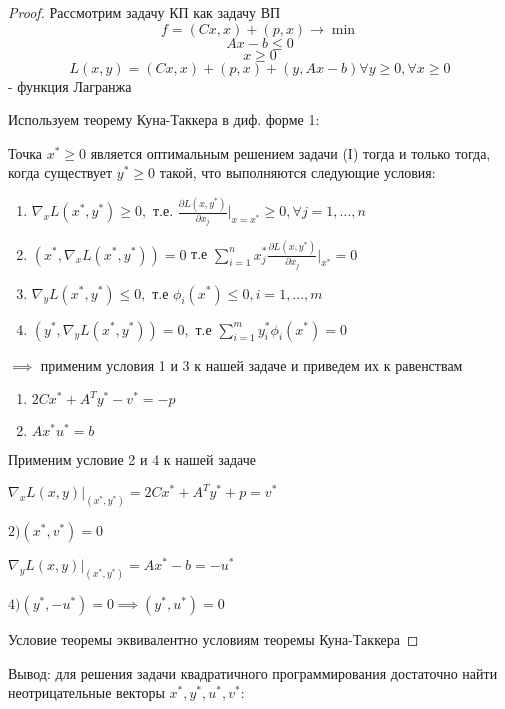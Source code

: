 \documentclass[a4paper]{article}
\theoremstyle{definition}
\theoremstyle{remark}
\begin{document}
\begin{proof}
    Рассмотрим задачу КП как задачу ВП
    \[f = (Cx, x) + (p, x)\to \min\]
    \[Ax - b\le 0\]
    \[x\ge 0\]
    \[L(x, y) = (Cx, x) + (p, x) + (y, Ax -b )\forall y\ge 0 , \forall x\ge 0\] - функция Лагранжа

    Используем теорему Куна-Таккера в диф. форме 1:
    
    Точка $x^* \ge 0$ является оптимальным решением задачи (I) тогда  и только тогда, когда существует $y^*\ge 0$ такой, что выполняются следующие условия:
    \begin{enumerate}
        \item $\nabla_x L(x^*, y^*) \ge 0,$ т.е. $\frac{\partial L(x, y^*)}{\partial x_j} |_{x = x^*} \ge 0, \forall j = 1, \dots, n$
        \item $(x^*, \nabla_x L(x^*, y^*)) = 0$ т.е $\sum_{i = 1}^n x^*_j\frac{\partial L(x, y^*)}{\partial x_j}|_{x^*} = 0$
        \item $\nabla_y L(x^*, y^*) \le 0,$ т.е $\phi_i(x^*)\le 0, i = 1, ..., m$
        \item $(y^*, \nabla_y L(x^*, y^*)) = 0, $ т.е $\sum_{i = 1}^{m}y^*_i \phi_i(x^*) = 0$
    \end{enumerate}
    $\implies$ применим условия 1 и 3 к нашей задаче и приведем их к равенствам 
    \begin{enumerate}
        \item $2Cx^* + A^T y^* - v^* = -p$
        \item $Ax^* u^* = b$
    \end{enumerate}
    Применим условие 2 и 4 к нашей задаче

    $\nabla_x L(x, y)|_{(x^*, y^*)} = 2Cx^* + A^T y^* + p = v^*$

    $2) (x^*, v^*) = 0$

    $\nabla_y L(x, y)|_{(x^*, y^*)} = Ax^* - b = -u^*$

    $4) (y^*, -u^*) = 0\implies (y^*, u^*) = 0$

    Условие теоремы эквивалентно условиям теоремы Куна-Таккера
\end{proof}
Вывод: для решения задачи квадратичного программирования достаточно найти неотрицательные векторы $x^*, y^*, u^*, v^*:$
\end{document}
